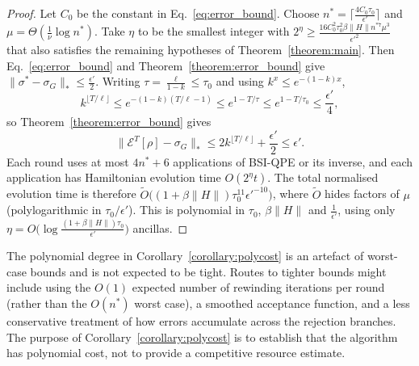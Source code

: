\documentclass[aps,floatfix,10pt,amssymb,amsfont,amsmath,superscriptaddress,float,nofootinbib,longbibliography,nobalancelastpage,twocolumn]{revtex4-2}
\begin{document}
\begin{proof}
Let $C_0$ be the constant in Eq.~\eqref{eq:error_bound}. Choose $n^*=\lceil\frac{4C_0\tau_0}{\epsilon'}\rceil$ and $\mu=\Theta(\frac{1}{\nu}\log n^*)$. Take $\eta$ to be the smallest integer with $2^{\eta}\geq\frac{16C_0^2\tau_0^2\beta\|H\|n^{*7}\mu^3}{\epsilon'^2}$ that also satisfies the remaining hypotheses of Theorem~\ref{theorem:main}. Then Eq.~\eqref{eq:error_bound} and Theorem~\ref{theorem:error_bound} give $\|\sigma^*-\sigma_G\|_*\leq\frac{\epsilon'}{2}$. Writing $\tau=\frac{\ell}{1-k}\leq\tau_0$ and using $k^x\leq e^{-(1-k)x}$,
\begin{equation}
    k^{\lfloor T/\ell\rfloor}\leq e^{-(1-k)(T/\ell-1)}\leq e^{1-T/\tau}\leq e^{1-T/\tau_0}\leq\frac{\epsilon'}{4},
\end{equation}
so Theorem~\ref{theorem:error_bound} gives
\begin{equation}
    \|\mathcal{E}^T[\rho]-\sigma_G\|_*\leq 2k^{\lfloor T/\ell\rfloor}+\frac{\epsilon'}{2}\leq\epsilon'.
\end{equation}
Each round uses at most $4n^*+6$ applications of BSI-QPE or its inverse, and each application has Hamiltonian evolution time $O(2^{\eta}t)$. The total normalised evolution time is therefore $\tilde O\big((1+\beta\|H\|)\tau_0^{11}\epsilon'^{-10}\big)$, where $\tilde O$ hides factors of $\mu$ (polylogarithmic in $\tau_0/\epsilon'$). This is polynomial in $\tau_0$, $\beta\|H\|$ and $\frac{1}{\epsilon'}$, using only $\eta=O\big(\log\frac{(1+\beta\|H\|)\tau_0}{\epsilon'}\big)$ ancillas.
\end{proof}
The polynomial degree in Corollary~\ref{corollary:polycost} is an artefact of worst-case bounds and is not expected to be tight. Routes to tighter bounds might include using the $O(1)$ expected number of rewinding iterations per round (rather than the $O(n^*)$ worst case), a smoothed acceptance function, and a less conservative treatment of how errors accumulate across the rejection branches. The purpose of Corollary~\ref{corollary:polycost} is to establish that the algorithm has polynomial cost, not to provide a competitive resource estimate.
 
\end{document}

